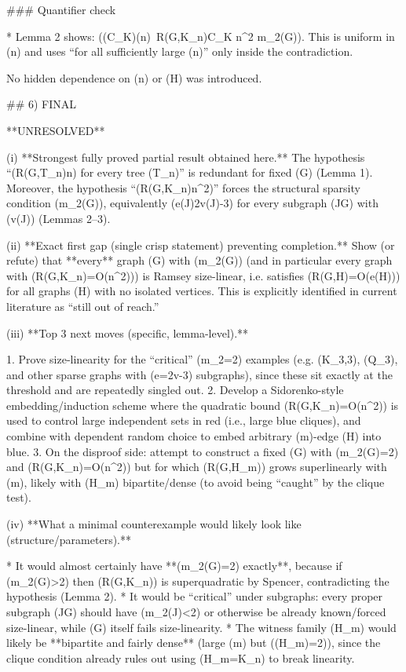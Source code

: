 ### Quantifier check

* Lemma 2 shows: ((\exists C_K)(\forall n)\ R(G,K_n)\le C_K n^2 \Rightarrow m_2(G)). This is uniform in (n) and uses “for all sufficiently large (n)” only inside the contradiction.

No hidden dependence on (n) or (H) was introduced.

## 6) FINAL

**UNRESOLVED**

(i) **Strongest fully proved partial result obtained here.**
The hypothesis “(R(G,T_n)\ll n) for every tree (T_n)” is redundant for fixed (G) (Lemma 1). Moreover, the hypothesis “(R(G,K_n)\ll n^2)” forces the structural sparsity condition (m_2(G)), equivalently (e(J)\le 2v(J)-3) for every subgraph (J\subseteq G) with (v(J)) (Lemmas 2–3).

(ii) **Exact first gap (single crisp statement) preventing completion.**
Show (or refute) that **every** graph (G) with (m_2(G)) (and in particular every graph with (R(G,K_n)=O(n^2))) is Ramsey size-linear, i.e. satisfies (R(G,H)=O(e(H))) for all graphs (H) with no isolated vertices. This is explicitly identified in current literature as “still out of reach.”

(iii) **Top 3 next moves (specific, lemma-level).**

1. Prove size-linearity for the “critical” (m_2=2) examples (e.g. (K_{3,3}), (Q_3), and other sparse graphs with (e=2v-3) subgraphs), since these sit exactly at the threshold and are repeatedly singled out.
2. Develop a Sidorenko-style embedding/induction scheme where the quadratic bound (R(G,K_n)=O(n^2)) is used to control large independent sets in red (i.e., large blue cliques), and combine with dependent random choice to embed arbitrary (m)-edge (H) into blue.
3. On the disproof side: attempt to construct a fixed (G) with (m_2(G)=2) and (R(G,K_n)=O(n^2)) but for which (R(G,H_m)) grows superlinearly with (m), likely with (H_m) bipartite/dense (to avoid being “caught” by the clique test).

(iv) **What a minimal counterexample would likely look like (structure/parameters).**

* It would almost certainly have **(m_2(G)=2) exactly**, because if (m_2(G)>2) then (R(G,K_n)) is superquadratic by Spencer, contradicting the hypothesis (Lemma 2).
* It would be “critical” under subgraphs: every proper subgraph (J\subsetneq G) should have (m_2(J)<2) or otherwise be already known/forced size-linear, while (G) itself fails size-linearity.
* The witness family (H_m) would likely be **bipartite and fairly dense** (large (m) but (\omega(H_m)=2)), since the clique condition already rules out using (H_m=K_n) to break linearity.

